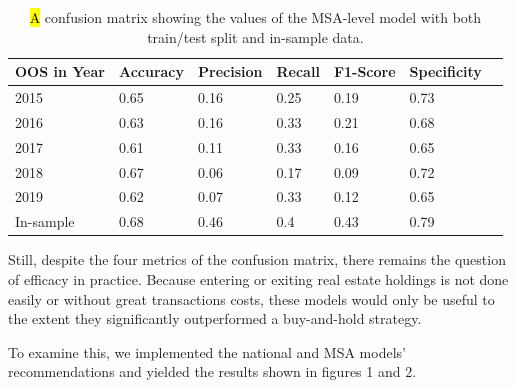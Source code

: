 \documentclass[jrfm,article,accept,oneauthor,pdftex]{Definitions/mdpi}
\begin{document}
\begin{table}[H]
\tabcolsep=0.345cm
  \caption{\hl{A} %
 confusion matrix showing the values of the MSA-level model with both train/test split and in-sample data.}
    \begin{tabular}{lllllll}
    \toprule
    \textbf{OOS in Year} & {\textbf{Accuracy}} & {\textbf{Precision}} & {\textbf{Recall}} & {\textbf{F1-Score}} & {\textbf{Specificity}} &  \\
    \midrule
    {2015} & 0.65  & 0.16  & 0.25  & 0.19  & 0.73  &  \\
    {2016} & 0.63  & 0.16  & 0.33  & 0.21  & 0.68  &  \\
    {2017} & 0.61  & 0.11  & 0.33  & 0.16  & 0.65  &  \\
    {2018} & 0.67  & 0.06  & 0.17  & 0.09  & 0.72  &  \\
    {2019} & 0.62  & 0.07  & 0.33  & 0.12  & 0.65  &  \\
    In-sample & 0.68  & 0.46  & 0.4   & 0.43  & 0.79  &  \\
    \bottomrule
    \end{tabular}%
  \label{tab:addlabel}%
\end{table}%



Still, despite the four metrics of the confusion matrix, there remains the question of efficacy in practice. Because entering or exiting real estate holdings is not done easily or without great transactions costs, these models would only be useful to the extent they significantly outperformed a buy-and-hold strategy.

To examine this, we implemented the national and MSA models' recommendations and yielded the results shown in figures 1 and 2.
\end{document}
